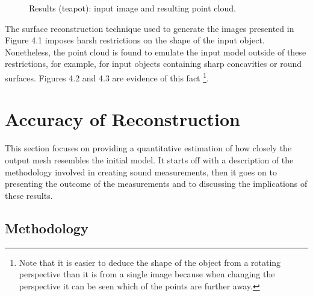 \documentclass[12pt,a4paper,twoside,openright]{report}
\begin{document}

\begin{figure}
\begin{minipage}{.5\linewidth}
\centering
{}
\end{minipage}%
\begin{minipage}{.5\linewidth}
\centering
{}
\end{minipage}\par\medskip
\caption{Results (teapot): input image and resulting point cloud.\protect\footnotemark}
\label{fig:main}
\end{figure}




The surface reconstruction technique used to generate the images presented in Figure 4.1 imposes harsh restrictions on the shape of the input object. Nonetheless, the point cloud is found to emulate the input model outside of these restrictions, for example, for input objects containing sharp concavities or round surfaces. Figures 4.2 and 4.3 are evidence of this fact \footnote{Note that it is easier to deduce the shape of the object from a rotating perspective than it is from a single image because when changing the perspective it can be seen which of the points are further away.}.

\section{Accuracy of Reconstruction}
This section focuses on providing a quantitative estimation of how closely the output mesh resembles the initial model. It starts off with a description of the methodology involved in creating sound measurements, then it goes on to presenting the outcome of the measurements and to discussing the implications of these results.

\subsection{Methodology}
\end{document}
